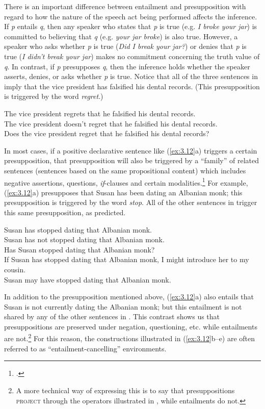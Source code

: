 There is an important difference between entailment and presupposition with regard to how the nature of the speech act being performed affects the inference. If \textit{p} entails \textit{q}, then any speaker who states that \textit{p} is true (e.g. \textit{I broke your jar}) is committed to believing that \textit{q} (e.g. \textit{your jar broke}) is also true. However, a speaker who asks whether \textit{p} is true (\textit{Did I break your jar?}) or denies that \textit{p} is true (\textit{I didn’t break your jar}) makes no commitment concerning the truth value of \textit{q}. In contrast, if \textit{p} presupposes \textit{q}, then the inference holds whether the speaker asserts, denies, or asks whether \textit{p} is true. Notice that all of the three sentences in  imply that the vice president has falsified his dental records. (This presupposition is triggered by the word \textit{regret}.)


\ea \label{ex:3.11}
\ea The vice president regrets that he falsified his dental records.\\
\ex The vice president doesn’t regret that he falsified his dental records.\\
\ex Does the vice president regret that he falsified his dental records?
                       \z
\z


In most cases, if a positive declarative sentence like (\ref{ex:3.12}a) triggers a certain presupposition, that presupposition will also be triggered by a “family” of related sentences (sentences based on the same propositional content) which includes negative assertions, questions, \textit{if}-clauses and certain modalities.\footnote{\citet{ChierchiaMcConnell-Ginet1990}.} For example, (\ref{ex:3.12}a) presupposes that Susan has been dating an Albanian monk; this presupposition is triggered by the word \textit{stop}. All of the other sentences in  trigger this same presupposition, as predicted.

\ea \label{ex:3.12}
\ea Susan has stopped dating that Albanian monk.\\ 
\ex Susan has not stopped dating that Albanian monk.\\
\ex Has Susan stopped dating that Albanian monk?\\
\ex If Susan has stopped dating that Albanian monk, I might introduce her to my cousin.\\
\ex Susan may have stopped dating that Albanian monk.
                       \z
\z


In addition to the presupposition mentioned above, (\ref{ex:3.12}a) also entails that Susan is not currently dating the Albanian monk; but this entailment is not shared by any of the other sentences in . This contrast shows us that presuppositions are preserved under negation, questioning, etc. while entailments are not.\footnote{A more technical way of expressing this is to say that presuppositions \textsc{project} through the operators illustrated in , while entailments do not.} For this reason, the constructions illustrated in (\ref{ex:3.12}b–e) are often referred to as ``entailment-cancelling'' environments.



